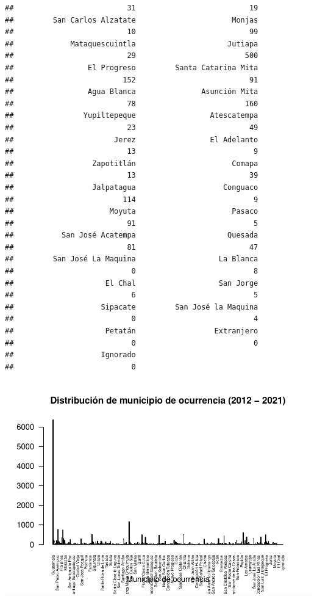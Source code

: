 \documentclass[
]{article}
\begin{document}
\begin{verbatim}
##                          31                          19 
##         San Carlos Alzatate                      Monjas 
##                          10                          99 
##             Mataquescuintla                     Jutiapa 
##                          29                         500 
##                 El Progreso         Santa Catarina Mita 
##                         152                          91 
##                 Agua Blanca               Asunción Mita 
##                          78                         160 
##                Yupiltepeque                 Atescatempa 
##                          23                          49 
##                       Jerez                 El Adelanto 
##                          13                           9 
##                  Zapotitlán                      Comapa 
##                          13                          39 
##                  Jalpatagua                    Conguaco 
##                         114                           9 
##                      Moyuta                      Pasaco 
##                          91                           5 
##           San José Acatempa                     Quesada 
##                          81                          47 
##         San José La Maquina                   La Blanca 
##                           0                           8 
##                     El Chal                   San Jorge 
##                           6                           5 
##                    Sipacate         San José la Maquina 
##                           0                           4 
##                     Petatán                  Extranjero 
##                           0                           0 
##                    Ignorado 
##                           0
\end{verbatim}

\includegraphics{Proyecto_files/figure-latex/frecuenciaMunicipio-1.pdf}
\end{document}
